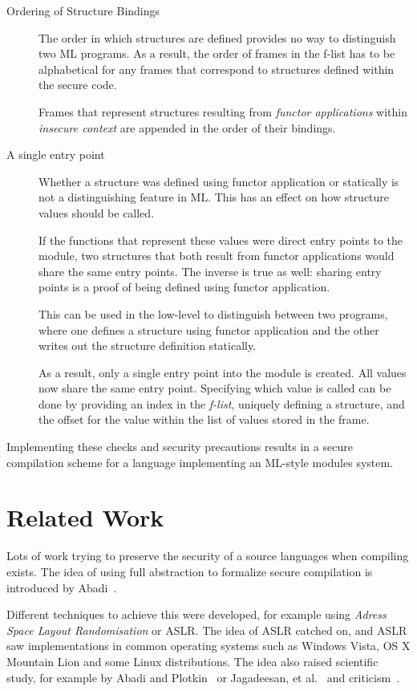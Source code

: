 \documentclass[11pt]{article}
\begin{document}
\begin{description}
\item[Ordering of Structure Bindings]
The order in which structures are defined provides no way to distinguish two ML programs.
As a result, the order of frames in the f-list has to be alphabetical for any frames that correspond to structures defined within the secure code.

Frames that represent structures resulting from \emph{functor applications} within \emph{insecure context} are appended in the order of their bindings.

\item[A single entry point]
Whether a structure was defined using functor application or statically is not a distinguishing feature in ML.
This has an effect on how structure values should be called.

If the functions that represent these values were direct entry points to the module, two structures that both result from functor applications would share the same entry points.
The inverse is true as well: sharing entry points is a proof of being defined using functor application.

This can be used in the low-level to distinguish between two programs, where one defines a structure using functor application and the other writes out the structure definition statically.

As a result, only a single entry point into the module is created. 
All values now share the same entry point.
Specifying which value is called can be done by providing an index in the \emph{f-list}, uniquely defining a structure, and the offset for the value within the list of values stored in the frame.
\end{description}

Implementing these checks and security precautions results in a secure compilation scheme for a language implementing an ML-style modules system.

\section{Related Work}
Lots of work trying to preserve the security of a source languages when compiling exists.
The idea of using full abstraction to formalize secure compilation is introduced by Abadi~\cite{Abadi}.

Different techniques to achieve this were developed, for example using \emph{Adress Space Layout Randomisation} or ASLR.%
The idea of ASLR catched on, and ASLR saw implementations in common operating systems such as Windows Vista, OS X Mountain Lion and some Linux distributions. 
The idea also raised scientific study, for example by Abadi and Plotkin~\cite{AbadiASLR} or Jagadeesan, et al.~\cite{Jagadeesan} and criticism~\cite{Shacham:2004:EAR:1030083.1030124,Strackx:2009:BMS:1519144.1519145}.
\end{document}
